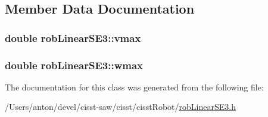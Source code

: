 \subsection{Member Data Documentation}
\hypertarget{classrob_linear_s_e3_a581ce540523b540cfcfb8619e5deb792}{}
\subsubsection[{vmax}]{\setlength{\rightskip}{0pt plus 5cm}double rob\+Linear\+S\+E3\+::vmax\hspace{0.3cm}{\ttfamily [protected]}}\label{classrob_linear_s_e3_a581ce540523b540cfcfb8619e5deb792}
\hypertarget{classrob_linear_s_e3_a691b0ddc307e875576d62f8e05762c1f}{}
\subsubsection[{wmax}]{\setlength{\rightskip}{0pt plus 5cm}double rob\+Linear\+S\+E3\+::wmax\hspace{0.3cm}{\ttfamily [protected]}}\label{classrob_linear_s_e3_a691b0ddc307e875576d62f8e05762c1f}


The documentation for this class was generated from the following file\+:\begin{DoxyCompactItemize}
\item 
/\+Users/anton/devel/cisst-\/saw/cisst/cisst\+Robot/\hyperlink{rob_linear_s_e3_8h}{rob\+Linear\+S\+E3.\+h}\end{DoxyCompactItemize}
